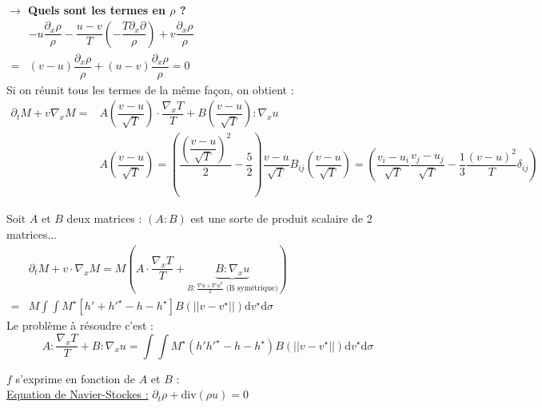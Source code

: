 \documentclass[12pt,a4paper]{article}
\begin{document}
\newpage

\textbf{$\longrightarrow$ Quels sont les termes en $\rho$ ?}\\

$\begin{aligned}
	& - u \dfrac{\partial_x \rho}\rho - \dfrac{u-v}T\left(-\dfrac{T\partial_x\partial}\rho\right) + v\dfrac{\partial_x\rho}\rho \\
	=&(v-u)\dfrac{\partial_x \rho}{\rho} + (u-v)\dfrac{\partial_x \rho}{\rho} = 0
\end{aligned}$\\

Si on réunit tous les termes de la même façon, on obtient :
\[
\begin{aligned}
	\partial_t M + v\nabla_x M =& A\left(\dfrac{v-u}{\sqrt T}\right)\cdot\dfrac{\nabla_x T}T + B\left(\dfrac{v-u}{\sqrt{T}}\right):\nabla_x u \\
	&A\left(\dfrac{v-u}{\sqrt T}\right) = \left(\dfrac{\left(\dfrac{v-u}{\sqrt T}\right)^2}2 - \dfrac52\right)\dfrac{v-u}{\sqrt T}B_{ij}\left(\dfrac{v-u}{\sqrt T}\right) = \left(\dfrac{v_i-u_i}{\sqrt{T}}\dfrac{v_j-u_j}{\sqrt{T}}-\dfrac13\dfrac{(v-u)^2}T\delta_{ij}\right)
\end{aligned}
\]

Soit $A$ et $B$ deux matrices : $\left(A : B\right)$ est une sorte de produit scalaire  de 2 matrices...\\

$\begin{aligned}
	& \partial_t M + v\cdot \nabla_x M = M\left(A\cdot\dfrac{\nabla_x T}T + \underbrace{B:\nabla_x u}_{B:\frac{\nabla u + \nabla u^T}2 \text{ (B symétrique)}}\right)\\
	=&M\displaystyle\int\int M^\star\left[h'+h'^\star - h-h^\star\right]B(|\!|v-v^\star|\!|)\mathrm dv^\star \mathrm d\sigma
\end{aligned}$\\

Le problème à résoudre c'est : 
\[
A:\dfrac{\nabla_x T}{T} + B : \nabla_x u = \displaystyle\int\int M^\star\left(h'h'^\star-h-h^\star\right)B\left(|\!|v-v^\star|\!|\right)\mathrm dv^\star \mathrm d\sigma
\]

$f$ s'exprime en fonction de $A$ et $B$ : \\

\underline{Equation de Navier-Stockes :} $\partial_t \rho + \mathrm{div}(\rho u) = 0$\\
\end{document}
